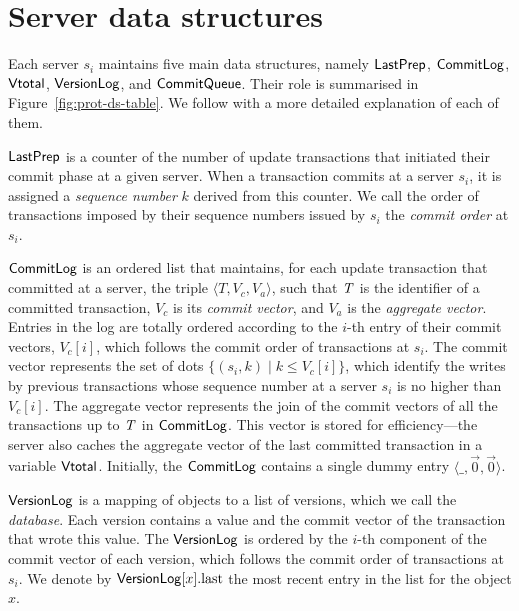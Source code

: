 \section{Server data structures}

Each server $s_i$ maintains five main data structures, namely $\mathsf{LastPrep}$, $\mathsf{CommitLog}$, $\mathsf{Vtotal}$, $\mathsf{VersionLog}$, and $\mathsf{CommitQueue}$. Their role is summarised in Figure~\ref{fig:prot-ds-table}. We follow with a more detailed explanation of each of them.

$\mathsf{LastPrep}$ is a counter of the number of update transactions that initiated their commit phase at a given server. When a transaction commits at a server $s_i$, it is assigned a \emph{sequence number} $k$ derived from this counter. We call the order of transactions imposed by their sequence numbers issued by $s_i$ the \emph{commit order} at $s_i$.


$\mathsf{CommitLog}$ is an ordered list that maintains, for each update transaction that committed at a server, the triple $\langle T,V_c,V_a\rangle$, such that $\mathit{T}$ is the identifier of a committed transaction, $V_c$ is its \emph{commit vector}, and $V_a$ is the \emph{aggregate vector}. Entries in the log are totally ordered according to the $i$-th entry of their commit vectors, $V_c[i]$, which follows the commit order of transactions at $s_i$. The commit vector represents the set of dots $\{(s_i, k) \mid k \le V_c[i]\}$, which identify the writes by previous transactions whose sequence number at a server $s_i$ is no higher than $V_c[i]$. The aggregate vector represents the join of the commit vectors of all the transactions up to $\mathit{T}$ in $\mathsf{CommitLog}$. This vector is stored for efficiency---the server also caches the aggregate vector of the last committed transaction in a variable $\mathsf{Vtotal}$. Initially, the $\mathsf{CommitLog}$ contains a single dummy entry $\langle \_, \vec{0}, \vec{0} \rangle$.


$\mathsf{VersionLog}$ is a mapping of objects to a list of versions, which we call the \emph{database}. Each version contains a value and the commit vector of the transaction that wrote this value. The $\mathsf{VersionLog}$ is ordered by the $i$-th component of the commit vector of each version, which follows the commit order of transactions at $s_i$. We denote by $\mathsf{VersionLog}[x].{\rm last}$ the most recent entry in the list for the object $x$.


